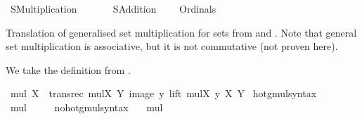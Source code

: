 %
\begin{isabellebody}%
%
%
\isadelimdocument
%
\endisadelimdocument
%
\isatagdocument
\isanewline
%
\isamarkuptrue%
%
\endisatagdocument
{\isafolddocument}%
%
\isadelimdocument
%
\endisadelimdocument
%
\isadelimtheory
%
\endisadelimtheory
%
\isatagtheory
{}\isamarkupfalse%
\ SMultiplication\isanewline
\ \ \isanewline
\ \ \ \ SAddition\isanewline
\ \ \ \ Ordinals\isanewline
{}%
\endisatagtheory
{\isafoldtheory}%
%
\isadelimtheory
%
\endisadelimtheory
%
\isadelimdocument
%
\endisadelimdocument
%
\isatagdocument
%
\isamarkuptrue%
%
\endisatagdocument
{\isafolddocument}%
%
\isadelimdocument
%
\endisadelimdocument
%
\begin{isamarkuptext}%
Translation of generalised set multiplication for sets from \cite{kirby_set_arithemtics}
and \cite{ZFC_in_HOL_AFP}. Note that general set multiplication is associative,
but it is not commutative (not proven here).%
\end{isamarkuptext}\isamarkuptrue%
%
\begin{isamarkuptext}%
We take the definition from \cite{kirby_set_arithemtics}.%
\end{isamarkuptext}\isamarkuptrue%
\isamarkupfalse%
\ {\isachardoublequoteopen}mul\ X\ {\isasymequiv}\ transrec\ {\isacharparenleft}{\kern0pt}{\isasymlambda}mulX\ Y{\isachardot}{\kern0pt}\ {\isasymUnion}{\isacharparenleft}{\kern0pt}image\ {\isacharparenleft}{\kern0pt}{\isasymlambda}y{\isachardot}{\kern0pt}\ lift\ {\isacharparenleft}{\kern0pt}mulX\ y{\isacharparenright}{\kern0pt}\ X{\isacharparenright}{\kern0pt}\ Y{\isacharparenright}{\kern0pt}{\isacharparenright}{\kern0pt}{\isachardoublequoteclose}\isanewline
\isanewline
{}\isamarkupfalse%
\ hotg{\isacharunderscore}{\kern0pt}mul{\isacharunderscore}{\kern0pt}syntax\ \ \isamarkupfalse%
\ mul\ {\isacharparenleft}{\kern0pt}\ {\isachardoublequoteopen}{\isacharasterisk}{\kern0pt}{\isachardoublequoteclose}\ {}{}{\isacharparenright}{\kern0pt}\ \isamarkupfalse%
\isanewline
{}\isamarkupfalse%
\ no{\isacharunderscore}{\kern0pt}hotg{\isacharunderscore}{\kern0pt}mul{\isacharunderscore}{\kern0pt}syntax\ \ \isamarkupfalse%
\ mul\ {\isacharparenleft}{\kern0pt}\ {\isachardoublequoteopen}{\isacharasterisk}{\kern0pt}{\isachardoublequoteclose}\ {}{}{\isacharparenright}{\kern0pt}\ \isamarkupfalse%

\end{isabellebody}
